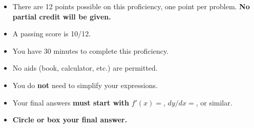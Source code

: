 \documentclass[12pt]{article}
\begin{document}
\begin{itemize}
\addtolength\itemsep{-1mm}
\item There are 12 points possible on this proficiency, one point per problem. {\bf No partial credit will be given.}

\item A passing score is 10/12.

\item You have 30 minutes to complete this proficiency.

\item No aids (book, calculator, etc.) are permitted.  

\item You do \textbf{not} need to simplify your expressions.



\item Your final answers \textbf{must start with} $f'(x)=$, $dy/dx=$, or similar.

\item {\bf Circle or box your final answer.}
\end{itemize}
\end{document}
